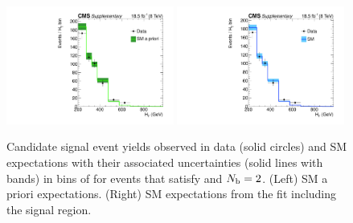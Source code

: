 \clearpage
\begin{figure}[h!]
  \begin{center}
    \includegraphics[width=0.49\textwidth,page=2]{figures/fit_result/bestFit_2012dev_RQcdZero_fZinvAll_2b_le3j-1_smOnly} 
    \includegraphics[width=0.49\textwidth,page=2]{figures/fit_result/bestFit_2012dev_RQcdZero_fZinvAll_2b_le3j-1h_smOnly} \\
    \caption{\label{fig:best-fit-0b} Candidate signal event yields
      observed in data (solid circles) and SM expectations with their
      associated uncertainties (solid lines with bands) in bins of
      \scalht for events that satisfy \njetlow and $N_{\text{b}} = 2$. (Left)
      SM a priori expectations. (Right) SM expectations from the fit
      including the signal region. }
  \end{center}
\end{figure}

